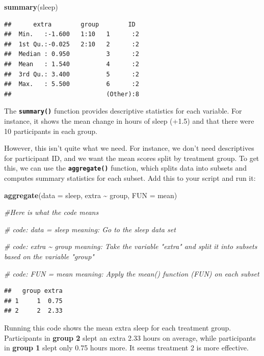 \documentclass[
]{book}
\newenvironment{Shaded}{\begin{snugshade}}{\end{snugshade}}
\newcommand{\AttributeTok}[1]{\textcolor[rgb]{0.13,0.29,0.53}{#1}}
\newcommand{\CommentTok}[1]{\textcolor[rgb]{0.56,0.35,0.01}{\textit{#1}}}
\newcommand{\FunctionTok}[1]{\textcolor[rgb]{0.13,0.29,0.53}{\textbf{#1}}}
\newcommand{\NormalTok}[1]{#1}
\newcommand{\SpecialCharTok}[1]{\textcolor[rgb]{0.81,0.36,0.00}{\textbf{#1}}}
\begin{document}
\begin{Shaded}
\begin{Highlighting}[]
\FunctionTok{summary}\NormalTok{(sleep) }
\end{Highlighting}
\end{Shaded}

\begin{verbatim}
##      extra        group        ID   
##  Min.   :-1.600   1:10   1      :2  
##  1st Qu.:-0.025   2:10   2      :2  
##  Median : 0.950          3      :2  
##  Mean   : 1.540          4      :2  
##  3rd Qu.: 3.400          5      :2  
##  Max.   : 5.500          6      :2  
##                          (Other):8
\end{verbatim}

The \textbf{\texttt{summary()}} function provides descriptive statistics for each variable. For instance, it shows the mean change in hours of sleep (+1.5) and that there were 10 participants in each group.

However, this isn't quite what we need. For instance, we don't need descriptives for participant ID, and we want the mean scores split by treatment group. To get this, we can use the \textbf{\texttt{aggregate()}} function, which splits data into subsets and computes summary statistics for each subset. Add this to your script and run it:

\begin{Shaded}
\begin{Highlighting}[]
\FunctionTok{aggregate}\NormalTok{(}\AttributeTok{data =}\NormalTok{ sleep, extra }\SpecialCharTok{\textasciitilde{}}\NormalTok{ group, }\AttributeTok{FUN =}\NormalTok{ mean)}


\CommentTok{\#Here is what the code means}


\CommentTok{\# code: data = sleep meaning: Go to the sleep data set}

\CommentTok{\# code: extra \textasciitilde{} group meaning: Take the variable "extra" and split it into subsets based on the variable "group"}

\CommentTok{\# code: FUN = mean meaning: Apply the mean() function (FUN) on each subset }
\end{Highlighting}
\end{Shaded}

\begin{verbatim}
##   group extra
## 1     1  0.75
## 2     2  2.33
\end{verbatim}

Running this code shows the mean extra sleep for each treatment group. Participants in \textbf{group 2} slept an extra 2.33 hours on average, while participants in \textbf{group 1} slept only 0.75 hours more. It seems treatment 2 is more effective.
\end{document}
